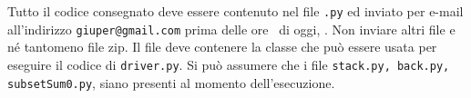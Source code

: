 \documentclass{amsart}
\begin{document}
\medskip{}
Tutto il codice consegnato deve essere contenuto nel file
{\tt \nomeClasse .py} ed inviato per e-mail all'indirizzo
{\tt giuper@gmail.com} prima delle ore \oraconsegna\ di oggi, 
\dataoggi. Non inviare altri file e n\'e tantomeno file zip.
Il file deve contenere la classe {\tt \nomeClasse}  
che pu\`o essere usata per eseguire
il codice di {\tt driver.py}. Si pu\`o assumere che i file
{\tt stack.py, back.py, subsetSum0.py},
siano presenti al momento dell'esecuzione. 
\end{document}
